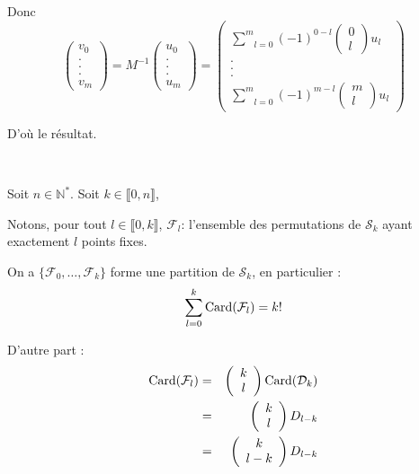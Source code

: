 Donc
\[ \left( \begin{array}{c}
     v_0\\
     .\\
     .\\
     .\\
     v_m
   \end{array} \right) = M^{- 1} \left( \begin{array}{c}
     u_0\\
     .\\
     .\\
     .\\
     u_m
   \end{array} \right) = \left( \begin{array}{c}
     \underset{l = 0}{\overset{m}{\sum}} (- 1)^{0 - l} \left( \begin{array}{c}
       0\\
       l
     \end{array} \right) u_l\\
     .\\
     .\\
     .\\
     \underset{l = 0}{\overset{m}{\sum}} (- 1)^{m - l} \left( \begin{array}{c}
       m\\
       l
     \end{array} \right) u_l
   \end{array} \right) \]


D'o{\`u} le r{\'e}sultat.

\

 Soit $n \in \mathbb{N}^{\ast}$. Soit $k \in \llbracket 0, n
\rrbracket$,

Notons, pour tout $l \in \llbracket 0, k \rrbracket$, $\mathcal{F}_l$:
l'ensemble des permutations de $\mathcal{S}_k$ ayant exactement $l$ points
fixes.

On a $\{ \mathcal{F}_0, \ldots, \mathcal{F}_k \}$ forme une partition de
$\mathcal{S}_k$, en particulier :
\[ \underset{l = 0}{\overset{k}{\sum}} \operatorname{Card} (\mathcal{F}_l) = k! \]


D'autre part :
\begin{eqnarray*}
  \operatorname{Card} (\mathcal{F}_l) & = & \left( \begin{array}{c}
    k\\
    l
  \end{array} \right) \operatorname{Card} (\mathcal{D}_k)\\
  & = & \left( \begin{array}{c}
    k\\
    l
  \end{array} \right) D_{l - k}\\
  & = & \left( \begin{array}{c}
    k\\
    l - k
  \end{array} \right) D_{l - k}
\end{eqnarray*}


